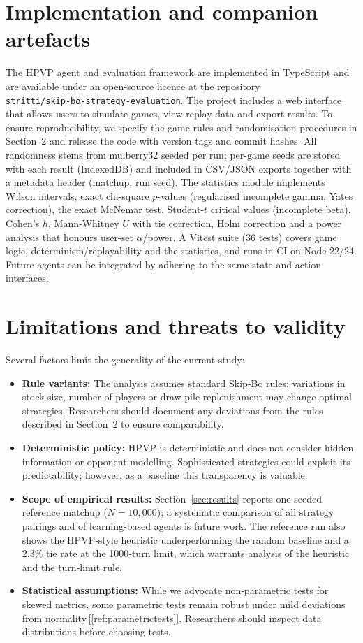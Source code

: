 \documentclass[11pt]{article}
\begin{document}
\section{Implementation and companion artefacts}
The HPVP agent and evaluation framework are implemented in TypeScript and are available under an open‑source licence at the repository \texttt{stritti/skip‑bo‑strategy‑evaluation}. The project includes a web interface that allows users to simulate games, view replay data and export results. To ensure reproducibility, we specify the game rules and randomisation procedures in Section 2 and release the code with version tags and commit hashes. All randomness stems from mulberry32 seeded per run; per-game seeds are stored with each result (IndexedDB) and included in CSV/JSON exports together with a metadata header (matchup, run seed). The statistics module implements Wilson intervals, exact chi-square $p$-values (regularised incomplete gamma, Yates correction), the exact McNemar test, Student-$t$ critical values (incomplete beta), Cohen's $h$, Mann‑Whitney $U$ with tie correction, Holm correction and a power analysis that honours user-set $\alpha$/power. A Vitest suite (36 tests) covers game logic, determinism/replayability and the statistics, and runs in CI on Node 22/24. Future agents can be integrated by adhering to the same state and action interfaces.

\section{Limitations and threats to validity}
Several factors limit the generality of the current study:
\begin{itemize}
\item \textbf{Rule variants:} The analysis assumes standard Skip‑Bo rules; variations in stock size, number of players or draw‑pile replenishment may change optimal strategies. Researchers should document any deviations from the rules described in Section 2 to ensure comparability.
\item \textbf{Deterministic policy:} HPVP is deterministic and does not consider hidden information or opponent modelling. Sophisticated strategies could exploit its predictability; however, as a baseline this transparency is valuable.
\item \textbf{Scope of empirical results:} Section~\ref{sec:results} reports one seeded reference matchup ($N=10{,}000$); a systematic comparison of all strategy pairings and of learning‑based agents is future work. The reference run also shows the HPVP‑style heuristic underperforming the random baseline and a 2.3\% tie rate at the 1000‑turn limit, which warrants analysis of the heuristic and the turn‑limit rule.
\item \textbf{Statistical assumptions:} While we advocate non‑parametric tests for skewed metrics, some parametric tests remain robust under mild deviations from normality\,[\ref{ref:parametrictests}]. Researchers should inspect data distributions before choosing tests.
\end{itemize}
\end{document}
